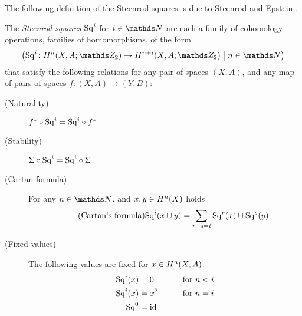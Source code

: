 The following definition of the Steenrod squares is due to
Steenrod and Epstein \cite[Chap.~I.1, p.~1]{steenrodepstein}.
\begin{Def}\label{def:sq}
  The \emph{Steenrod squares} $\mathrm{Sq}^{i}$ for $i\in\Nat$ are each a family
  of cohomology operations, \idest families of homomorphisms, of the
  form
  \begin{gather*}
    \left(
      \Sq i\colon \H^n(X, A;\Zmod2) \to \H^{n+i}(X, A;\Zmod2)
      \;\middle|\;
      n\in\Nat
    \right)
  \end{gather*}
  that satisfy the following relations for any pair of spaces $(X,A)$, and any map of
  pairs of spaces $f\colon (X,A)\to (Y,B)$:
  \begin{description}
  \item[(Naturality)]\label{item:sqnaturality} ${f}^*\circ\mathrm{Sq}^{i} = \mathrm{Sq}^{i}\circ{f}^*$
  \item[(Stability)]\label{item:sqstability} $\Sigma\circ\mathrm{Sq}^{i} = \mathrm{Sq}^{i}\circ\Sigma$
  \item[(Cartan formula)] For any $n\in\Nat$, and $x,y\in H^n(X)$ holds
    \begin{gather}\label{tag:cartan}\tag{Cartan's formula}
      \mathrm{Sq}^{i}(x\cup y) = \sum_{r+s=i}\mathrm{Sq}^{r}(x)\cup\mathrm{Sq}^{s}(y)
    \end{gather}
  \item[(Fixed values)] The following values are fixed for $x\in H^n(X,A)$:
    \begin{alignat}{4}
      \mathrm{Sq}^{i}(x) &= 0     & \qquad\text{for }n<i \label{eq:sqlowerbound}\\
      \mathrm{Sq}^{i}(x) &= x^2   & \qquad\text{for }n=i \label{eq:sqsquared}\\
      \mathrm{Sq}^{0}    &= \mathrm{id}_{}   \label{eq:sqidentity}
    \end{alignat}

\end{description}
\end{Def}
